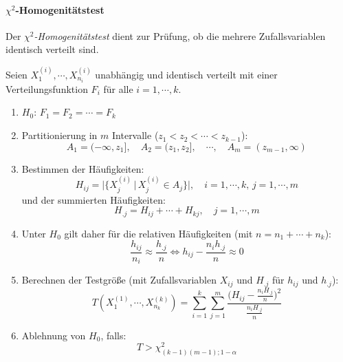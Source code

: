 \documentclass[a4paper, 11pt, accentcolor = tud3b]{tudreport}
\newcommand{\forwhich}{\ensuremath{{\,\vert\,}}}
\begin{document}
            \paragraph{\(\chi^2\)-Homogenitätstest}
                Der \textit{\(\chi^2\)-Homogenitätstest} dient zur Prüfung, ob die mehrere Zufallsvariablen identisch verteilt sind.
                
                Seien \( X_1^{(i)}, \cdots, X_{n_i}^{(i)} \) unabhängig und identisch verteilt mit einer Verteilungsfunktion \(F_i\) für alle \( i = 1, \cdots, k \).
                \begin{enumerate}
                	\item \(H_0\): \quad \( F_1 = F_2 = \cdots = F_k \)
                	\item Partitionierung in \(m\) Intervalle (\( z_1 < z_2 < \cdots < z_{k-1} \)):
	                	\begin{equation*}
		                	A_1 = (-\infty, z_1], \quad A_2 = (z_1, z_2], \quad \cdots, \quad A_m = (z_{m-1}, \infty)
	                	\end{equation*}
	                \item Bestimmen der Häufigkeiten:
		                \begin{equation*}
			                H_{ij} = \big| \{ X_j^{(i)} \forwhich X_j^{(i)} \in A_j \} \big|, \quad i = 1, \cdots, k,\, j = 1, \cdots, m
		                \end{equation*}
		                und der summierten Häufigkeiten:
		                \begin{equation*}
			                H_{.j} = H_{ij} + \cdots + H_{kj}, \quad j = 1, \cdots, m
		                \end{equation*}
		            \item Unter \(H_0\) gilt daher für die relativen Häufigkeiten (mit \( n = n_1 + \cdots + n_k \)):
			            \begin{equation*}
				            \frac{h_{ij}}{n_i} \approx \frac{h_{.j}}{n} \iff h_{ij} - \frac{n_i h_{.j}}{n} \approx 0
			            \end{equation*}
			        \item Berechnen der Testgröße (mit Zufallsvariablen \(X_{ij}\) und \(H_{.j}\) für \(h_{ij}\) und \(h_{.j}\)):
				        \begin{equation*}
					        T(X_1^{(1)}, \cdots, X_{n_k}^{(k)}) = \sum_{i=1}^{k} \sum_{j=1}^m \frac{\Big(H_{ij} - \frac{n_i H_{.j}}{n}\Big)^2}{\frac{n_i H_{.j}}{n}}
				        \end{equation*}
				    \item Ablehnung von \(H_0\), falls:
					    \begin{equation*}
						    T > \chi_{(k-1)(m-1); 1-\alpha}^2
					    \end{equation*}
                \end{enumerate}
\end{document}
